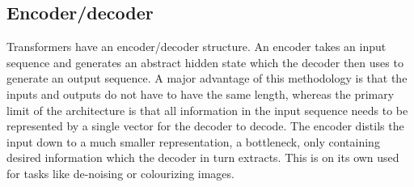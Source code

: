 


\subsection{Encoder/decoder}
Transformers have an encoder/decoder structure. An encoder takes an input sequence and generates an abstract hidden state which the decoder then uses to generate an output sequence. A major advantage of this methodology is that the inputs and outputs do not have to have the same length, whereas the primary limit of the architecture is that all information in the input sequence needs to be represented by a single vector for the decoder to decode. The encoder distils the input down to a much smaller representation, a bottleneck, only containing desired information which the decoder in turn extracts. This is on its own used for tasks like de-noising or colourizing images. 

